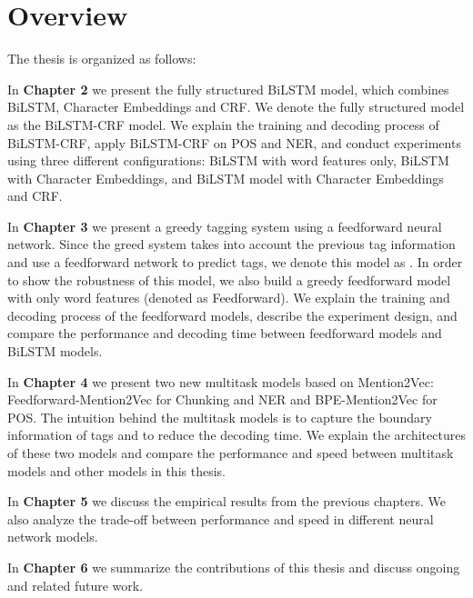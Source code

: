 \begin{enumerate}
\end{enumerate}


\section{Overview}
The thesis is organized as follows:

In \textbf{Chapter 2} we present the fully structured BiLSTM model, which combines BiLSTM, Character Embeddings and CRF. We denote the fully structured model as the BiLSTM-CRF model. We explain the training and decoding process of BiLSTM-CRF, apply BiLSTM-CRF on POS and NER, and conduct experiments using three different configurations: BiLSTM with word features only, BiLSTM with Character Embeddings, and BiLSTM model with Character Embeddings and CRF.

In \textbf{Chapter 3}  we present a greedy tagging system using a feedforward neural network. Since the greed system takes into account the previous tag information and use a feedforward network to predict tags, we denote this model as \ffa. In order to show the robustness of this model, we also build a greedy feedforward model with only word features (denoted as Feedforward). We explain the training and decoding process of the feedforward models, describe the experiment design, and compare the performance and decoding time between feedforward models and BiLSTM models.


In \textbf{Chapter 4} we present two new multitask models based on Mention2Vec: Feedforward-Mention2Vec for Chunking and NER and BPE-Mention2Vec for POS. The intuition behind the multitask models is to capture the boundary information of tags and to reduce the decoding time. We explain the architectures of these two models and compare the performance and speed between multitask models and other models in this thesis.

In \textbf{Chapter 5} we discuss the empirical results from the previous chapters. We also analyze the trade-off between performance and speed in different neural network models.

In \textbf{Chapter 6} we summarize the contributions of this thesis and discuss ongoing and related future work.